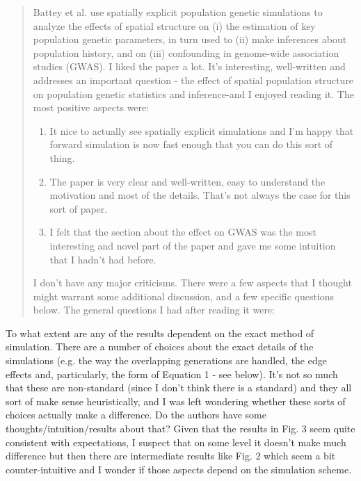 \begin{quote}
    Battey et al. use spatially explicit population genetic simulations to
    analyze the effects of spatial structure on (i) the estimation of key
    population genetic parameters, in turn used to (ii) make inferences about
    population history, and on (iii) confounding in genome-wide association
    studies (GWAS). I liked the paper a lot. It's interesting, well-written and
    addresses an important question - the effect of spatial population
    structure on population genetic statistics and inference-and I enjoyed
    reading it. The most positive aspects were:

    \begin{enumerate}
        \item It nice to actually see spatially explicit simulations and I'm happy that forward simulation is now fast enough that you can do this sort of thing.
        \item The paper is very clear and well-written, easy to understand the motivation and most of the details. That's not always the case for this sort of paper.
        \item I felt that the section about the effect on GWAS was the most interesting and novel part of the paper and gave me some intuition that I hadn't had before.
    \end{enumerate}

    I don't have any major criticisms. There were a few aspects that I thought might warrant some additional discussion, and a few specific questions below. The general questions I had after reading it were:
\end{quote}

\begin{point}{}
    To what extent are any of the results dependent on the exact method of simulation. There are a number of choices about the exact details of the simulations (e.g. the way the overlapping generations are handled, the edge effects and, particularly, the form of Equation 1 - see below). It's not so much that these are non-standard (since I don't think there is a standard) and they all sort of make sense heuristically, and I was left wondering whether these sorts of choices actually make a difference. Do the authors have some thoughts/intuition/results about that? Given that the results in Fig. 3 seem quite consistent with expectations, I suspect that on some level it doesn't make much difference but then there are intermediate results like Fig. 2 which seem a bit counter-intuitive and I wonder if those aspects depend on the simulation scheme.
\end{point}

